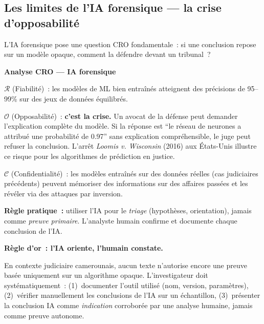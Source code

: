 \subsection{Les limites de l'IA forensique --- la crise d'opposabilité}

L'IA forensique pose une question CRO fondamentale~: si une conclusion
repose sur un modèle opaque, comment la défendre devant un tribunal~?

\begin{boxCRO}
\textbf{Analyse CRO --- IA forensique}

$\mathcal{R}$ (Fiabilité)~: les modèles de ML bien entraînés atteignent
des précisions de 95--99\% sur des jeux de données équilibrés.

$\mathcal{O}$ (Opposabilité)~: \textbf{c'est la crise.} Un avocat de la
défense peut demander l'explication complète du modèle. Si la réponse
est ``le réseau de neurones a attribué une probabilité de 0.97''
sans explication compréhensible, le juge peut refuser la conclusion.
L'arrêt \textit{Loomis v. Wisconsin} (2016) aux États-Unis illustre
ce risque pour les algorithmes de prédiction en justice.

$\mathcal{C}$ (Confidentialité)~: les modèles entraînés sur des données
réelles (cas judiciaires précédents) peuvent mémoriser des informations
sur des affaires passées et les révéler via des attaques par inversion.


\textbf{Règle pratique~:} utiliser l'IA pour le \emph{triage} (hypothèses,
orientation), jamais comme \emph{preuve primaire}. L'analyste humain
confirme et documente chaque conclusion de l'IA.
\end{boxCRO}

\begin{boxalert}
\textbf{Règle d'or~: l'IA oriente, l'humain constate.}

En contexte judiciaire camerounais, aucun texte n'autorise encore une
preuve basée uniquement sur un algorithme opaque. L'investigateur doit
systématiquement~: (1)~documenter l'outil utilisé (nom, version,
paramètres), (2)~vérifier manuellement les conclusions de l'IA sur un
échantillon, (3)~présenter la conclusion IA comme \emph{indication}
corroborée par une analyse humaine, jamais comme preuve autonome.
\end{boxalert}


